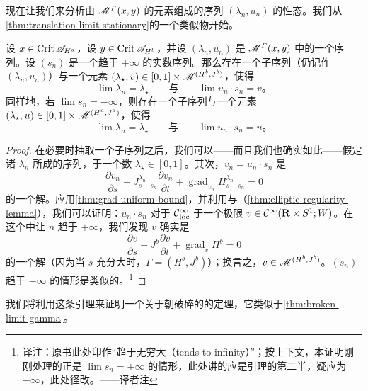 现在让我们来分析由 $\mathscr{M}^{\varGamma}(x,y)$ 的元素组成的序列 $(\lambda_{n},u_{n})$ 的性态。我们从\cref{thm:translation-limit-stationary}的一个类似物开始。

\begin{lemma}\label{thm:subsequence-broken}
设 $x\in\operatorname{Crit}\mathscr{A}_{H^{a}}$，设 $y\in\operatorname{Crit}\mathscr{A}_{H^{b}}$，并设 $(\lambda_{n},u_{n})$ 是 $\mathscr{M}^{\varGamma}(x,y)$ 中的一个序列。设 $(s_{n})$ 是一个趋于 $+\infty$ 的实数序列。那么存在一个子序列（仍记作 $(\lambda_{n},u_{n})$）与一个元素 $(\lambda_{\star},v)\in[0,1]\times\mathscr{M}^{(H^{b},J^{b})}$，使得
\[
\lim\lambda_{n}=\lambda_{\star}
\qquad\text{与}\qquad
\lim u_{n}\cdot s_{n}=v\text{。}
\]
同样地，若 $\lim s_{n}=-\infty$，则存在一个子序列与一个元素 $(\lambda_{\star},u)\in[0,1]\times\mathscr{M}^{(H^{a},J^{a})}$，使得
\[
\lim\lambda_{n}=\lambda_{\star}
\qquad\text{与}\qquad
\lim u_{n}\cdot s_{n}=u\text{。}
\]
\end{lemma}

\begin{proof}
在必要时抽取一个子序列之后，我们可以——而且我们也确实如此——假定诸 $\lambda_{n}$ 所成的序列\trConvergence，\trConvergence{}于一个数 $\lambda_{\star}\in[0,1]$。其次，$v_{n}=u_{n}\cdot s_{n}$ 是\trFloerEquation
\[
\frac{\partial v_{n}}{\partial s}+J^{\lambda_{n}}_{s+s_{n}}\frac{\partial v_{n}}{\partial t}
+\operatorname{grad}_{v_{n}}H^{\lambda_{n}}_{s+s_{n}}=0
\]
的一个解。应用\cref{thm:grad-uniform-bound}，并利用\trArzelaAscoliTheorem{}与\trEllipticRegularity{}（\cref{thm:elliptic-regularity-lemma}），我们可以证明：$u_{n}\cdot s_{n}$ 对于 $\mathcal{C}^{\infty}_{\mathrm{loc}}$ \trTopology{}\trConvergence{}于一个极限 $v\in\mathcal{C}^{\infty}(\mathbf{R}\times S^{1};W)$。在这个\trFloerEquation{}中让 $n$ 趋于 $+\infty$，我们发现 $v$ 确实是
\[
\frac{\partial v}{\partial s}+J^{b}\frac{\partial v}{\partial t}
+\operatorname{grad}_{v}H^{b}=0
\]
的一个解（因为当 $s$ 充分大时，$\varGamma=(H^{b},J^{b})$）；换言之，$v\in\mathscr{M}^{(H^{b},J^{b})}$。$(s_{n})$ 趋于 $-\infty$ 的情形是类似的。\footnote{译注：原书此处印作“趋于无穷大（tends to infinity）”；按上下文，本证明刚刚处理的正是 $\lim s_{n}=+\infty$ 的情形，此处讲的应是引理的第二半，疑应为 $-\infty$，此处径改。——译者注}
\end{proof}

我们将利用这条引理来证明一个关于朝破碎\trTrajectory{}的\trConvergence{}的定理，它类似于\cref{thm:broken-limit-gamma}。

